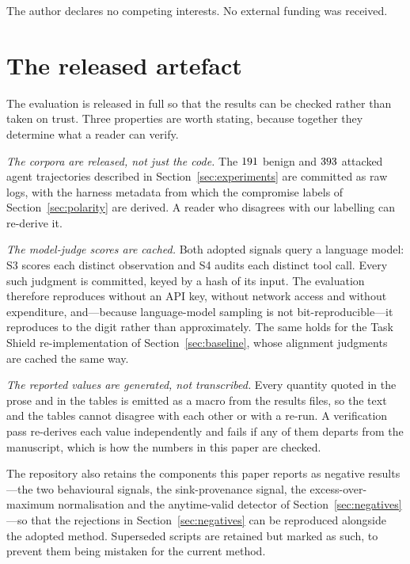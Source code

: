 \documentclass[preprint,12pt,number]{elsarticle}
\theoremstyle{definition}
\begin{document}
The author declares no competing interests. No external funding was received.

\appendix

\section{The released artefact}\label{app:artefact}

The evaluation is released in full so that the results can be checked rather than
taken on trust. Three properties are worth stating, because together they
determine what a reader can verify.

\emph{The corpora are released, not just the code.} The $191$ benign and
$393$ attacked agent trajectories described in Section~\ref{sec:experiments}
are committed as raw logs, with the harness metadata from which the compromise
labels of Section~\ref{sec:polarity} are derived. A reader who disagrees with our
labelling can re-derive it.

\emph{The model-judge scores are cached.} Both adopted signals query a language
model: S3 scores each distinct observation and S4 audits each distinct tool call.
Every such judgment is committed, keyed by a hash of its input. The evaluation
therefore reproduces without an API key, without network access and without
expenditure, and---because language-model sampling is not bit-reproducible---it
reproduces to the digit rather than approximately. The same holds for the Task
Shield re-implementation of Section~\ref{sec:baseline}, whose alignment judgments
are cached the same way.

\emph{The reported values are generated, not transcribed.} Every quantity quoted
in the prose and in the tables is emitted as a macro from the results files, so
the text and the tables cannot disagree with each other or with a re-run. A
verification pass re-derives each value independently and fails if any of them
departs from the manuscript, which is how the numbers in this paper are checked.

The repository also retains the components this paper reports as negative
results---the two behavioural signals, the sink-provenance signal, the
excess-over-maximum normalisation and the anytime-valid detector of
Section~\ref{sec:negatives}---so that the rejections in Section~\ref{sec:negatives}
can be reproduced alongside the adopted method. Superseded scripts are retained
but marked as such, to prevent them being mistaken for the current method.



\end{document}
